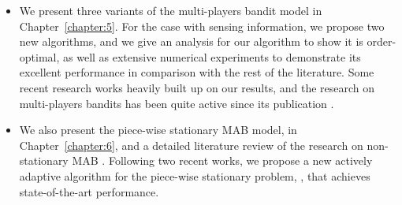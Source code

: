 \begin{itemize}

    \item
    We present three variants of the multi-players bandit model in Chapter~\ref{chapter:5}.
    For the case with sensing information, we propose two new algorithms, and we give an analysis for our algorithm \MCTopM{} to show it is order-optimal,
    as well as extensive numerical experiments to demonstrate its excellent performance in comparison with the rest of the literature.
    Some recent research works heavily built up on our results, and the research on multi-players bandits has been quite active since its publication \cite{Besson2018ALT}.


    \item
    We also present the piece-wise stationary MAB model, in Chapter~\ref{chapter:6}, and a detailed literature review of the research on non-stationary MAB \cite{Besson2019GLRT,Besson2019Gretsi}.
    Following two recent works, we propose a new actively adaptive algorithm for the piece-wise stationary problem, \GLRklUCB, that achieves state-of-the-art performance.

\end{itemize}



